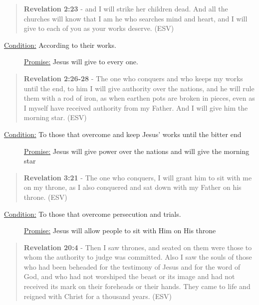 \documentclass[11pt]{article}
\begin{document}
\begin{quote}
\textbf{Revelation 2:23} - and I will strike her children dead. And all the churches will know that I am he who searches mind and heart, and I will give to each of you as your works deserve. (ESV)
\end{quote}

\begin{description}
\item[{\uline{Condition:} According to their works.}] \uline{Promise:} Jesus will give to every one.
\end{description}

\begin{quote}
\textbf{Revelation 2:26-28} - The one who conquers and who keeps my works until the end, to him I will give authority over the nations, and he will rule them with a rod of iron, as when earthen pots are broken in pieces, even as I myself have received authority from my Father. And I will give him the morning star. (ESV)
\end{quote}

\begin{description}
\item[{\uline{Condition:} To those that overcome and keep Jesus' works until the bitter end}] \uline{Promise:} Jesus will give power over the nations and will give the morning star
\end{description}

\begin{quote}
\textbf{Revelation 3:21} - The one who conquers, I will grant him to sit with me on my throne, as I also conquered and sat down with my Father on his throne. (ESV)
\end{quote}

\begin{description}
\item[{\uline{Condition:} To those that overcome persecution and trials.}] \uline{Promise:} Jesus will allow people to sit with Him on His throne
\end{description}

\begin{quote}
\textbf{Revelation 20:4} - Then I saw thrones, and seated on them were those to whom the authority to judge was committed. Also I saw the souls of those who had been beheaded for the testimony of Jesus and for the word of God, and who had not worshiped the beast or its image and had not received its mark on their foreheads or their hands. They came to life and reigned with Christ for a thousand years. (ESV)
\end{quote}
\end{document}
